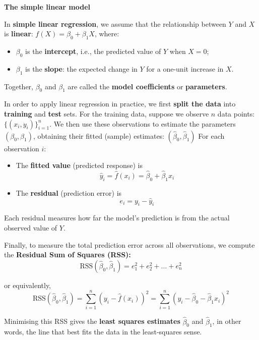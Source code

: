 \documentclass[
  letterpaper,
  DIV=11,
  numbers=noendperiod]{scrartcl}
\begin{document}
\textbf{The simple linear model}

In \textbf{simple linear regression}, we assume that the relationship
between \(Y\) and \(X\) is \textbf{linear}:
\(f(X) = \beta_0 + \beta_1 X\), where:

\begin{itemize}
\item
  \(\beta_0\) is the \textbf{intercept}, i.e., the predicted value of
  \(Y\) when \(X = 0\);
\item
  \(\beta_1\) is the \textbf{slope}: the expected change in \(Y\) for a
  one-unit increase in \(X\).
\end{itemize}

Together, \(\beta_0\) and \(\beta_1\) are called the \textbf{model
coefficients} or \textbf{parameters}.

In order to apply linear regression in practice, we first \textbf{split
the data} into \textbf{training} and \textbf{test} sets. For the
training data, suppose we observe \(n\) data points:
\(\{(x_i, y_i)\}_{i=1}^{n}\). We then use these observations to estimate
the parameters \((\beta_0, \beta_1)\), obtaining their fitted (sample)
estimates: \((\hat{\beta}_0, \hat{\beta}_1)\) For each observation
\(i\):

\begin{itemize}
\item
  The \textbf{fitted value} (predicted response) is
  \[\hat{y}_i = \hat{f}(x_i) = \hat{\beta}_0 + \hat{\beta}_1 x_i\]
\item
  The \textbf{residual} (prediction error) is \[e_i = y_i - \hat{y}_i\]
\end{itemize}

Each residual measures how far the model's prediction is from the actual
observed value of \(Y\).

Finally, to measure the total prediction error across all observations,
we compute the \textbf{Residual Sum of Squares (RSS):}
\[ \text{RSS}(\hat{\beta}_0, \hat{\beta}_1) = e_1^2 + e_2^2 + \dots + e_n^2 \]

or equivalently,
\[ \text{RSS}(\hat{\beta}_0, \hat{\beta}_1) = \sum_{i=1}^{n} (y_i - \hat{f}(x_i))^2 = \sum_{i=1}^{n} (y_i - \hat{\beta}_0 - \hat{\beta}_1 x_i)^2 \]

Minimising this RSS gives the \textbf{least squares estimates}
\(\hat{\beta}_0\) and \(\hat{\beta}_1\), in other words, the line that
best fits the data in the least-squares sense.
\end{document}
